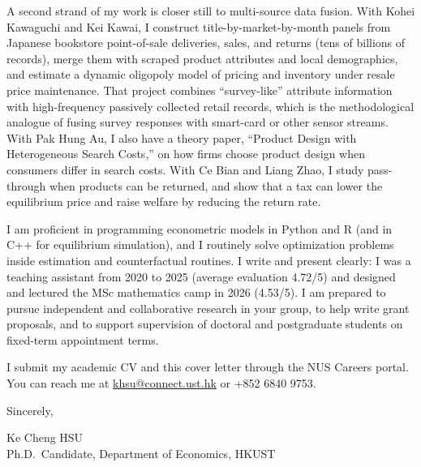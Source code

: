 \documentclass[11pt]{article}
\begin{document}
A second strand of my work is closer still to multi-source data fusion. With Kohei Kawaguchi and Kei Kawai, I construct title-by-market-by-month panels from Japanese bookstore point-of-sale deliveries, sales, and returns (tens of billions of records), merge them with scraped product attributes and local demographics, and estimate a dynamic oligopoly model of pricing and inventory under resale price maintenance. That project combines ``survey-like'' attribute information with high-frequency passively collected retail records, which is the methodological analogue of fusing survey responses with smart-card or other sensor streams. With Pak Hung Au, I also have a theory paper, ``Product Design with Heterogeneous Search Costs,'' on how firms choose product design when consumers differ in search costs. With Ce Bian and Liang Zhao, I study pass-through when products can be returned, and show that a tax can lower the equilibrium price and raise welfare by reducing the return rate.

I am proficient in programming econometric models in Python and R (and in C++ for equilibrium simulation), and I routinely solve optimization problems inside estimation and counterfactual routines. I write and present clearly: I was a teaching assistant from 2020 to 2025 (average evaluation 4.72/5) and designed and lectured the MSc mathematics camp in 2026 (4.53/5). I am prepared to pursue independent and collaborative research in your group, to help write grant proposals, and to support supervision of doctoral and postgraduate students on fixed-term appointment terms.

I submit my academic CV and this cover letter through the NUS Careers portal.\\
You can reach me at \href{mailto:khsu@connect.ust.hk}{khsu@connect.ust.hk} or +852 6840 9753.

\vspace{0.2em}
Sincerely,

\vspace{0.2em}
Ke Cheng HSU \\
Ph.D.\ Candidate, Department of Economics, HKUST
\end{document}
